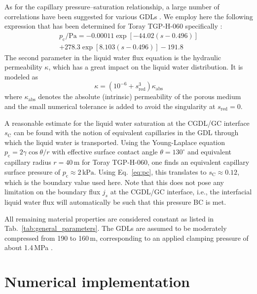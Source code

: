 \documentclass[fontsize=9pt,DIV=calc,a4paper,twocolumn]{scrartcl}
\begin{document}
As for the capillary pressure--saturation relationship, a large number of correlations have been suggested for various GDLs \cite{si:15}. We employ here the following expression that has been determined for Toray TGP-H-060 specifically \cite{nguyen:08}:
%
\begin{multline}
\label{eq:pc}
p_\mathrm{c}/\mathrm{Pa} = -0.00011\exp\left[-44.02(s-0.496)\right]\\
+278.3\exp\left[8.103(s-0.496)\right]-191.8
\end{multline}
%
The second parameter in the liquid water flux equation is the hydraulic permeability $\kappa$, which has a great impact on the liquid water distribution. It is modeled as \cite{nam:03}
%
\begin{equation}
\kappa = \left(10^{-6}+s_\mathrm{red}^3\right)\kappa_\mathrm{abs}
\end{equation}
%
where $\kappa_\mathrm{abs}$ denotes the absolute (intrinsic) permeability of the porous medium and the small numerical tolerance is added to avoid the singularity at $s_\mathrm{red}=0$.

A reasonable estimate for the liquid water saturation at the CGDL/GC interface $s_\mathrm{C}$ can be found with the notion of equivalent capillaries in the GDL through which the liquid water is transported. Using the Young-Laplace equation $p_\mathrm{c}=2\gamma\cos\theta/r$ with effective surface contact angle $\theta=130^\circ$ \cite{nguyen:08} and equivalent capillary radius $r=40\,$\textmu{}m \cite{holley:06} for Toray TGP-H-060, one finds an equivalent capillary surface pressure of $p_\mathrm{c}\approx2\,\mathrm{kPa}$. Using Eq.~\ref{eq:pc}, this translates to $s_\mathrm{C}\approx0.12$, which is the boundary value used here. Note that this does not pose any limitation on the boundary flux $j_s$ at the CGDL/GC interface, i.e., the interfacial liquid water flux will automatically be such that this pressure BC is met.

All remaining material properties are considered constant as listed in Tab.~\ref{tab:general_parameters}. The GDLs are assumed to be moderately compressed from 190 to 160\,\textmu{}m, corresponding to an applied clamping pressure of about 1.4\,MPa \cite{burheim:11}.

\section{Numerical implementation}
\end{document}
